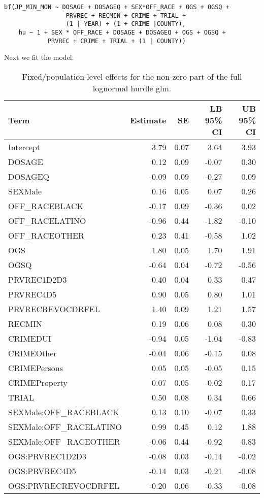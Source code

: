 \documentclass[
  letterpaper,
  DIV=11,
  numbers=noendperiod]{scrartcl}
\begin{document}
\begin{verbatim}
bf(JP_MIN_MON ~ DOSAGE + DOSAGEQ + SEX*OFF_RACE + OGS + OGSQ +
                 PRVREC + RECMIN + CRIME + TRIAL +
                 (1 | YEAR) + (1 + CRIME |COUNTY),
    hu ~ 1 + SEX * OFF_RACE + DOSAGE + DOSAGEQ + OGS + OGSQ +
            PRVREC + CRIME + TRIAL + (1 | COUNTY))
\end{verbatim}

Next we fit the model.

\hypertarget{tbl-brms-hurdle-model-summary-2}{}
\begin{table}
\caption{\label{tbl-brms-hurdle-model-summary-2}Fixed/population-level effects for the non-zero part of the full
lognormal hurdle glm. }\tabularnewline

\centering
\begin{tabular}{l|r|r|r|r}
\hline
Term & Estimate & SE & LB 95\% CI & UB 95\% CI\\
\hline
Intercept & 3.79 & 0.07 & 3.64 & 3.93\\
\hline
DOSAGE & 0.12 & 0.09 & -0.07 & 0.30\\
\hline
DOSAGEQ & -0.09 & 0.09 & -0.27 & 0.09\\
\hline
SEXMale & 0.16 & 0.05 & 0.07 & 0.26\\
\hline
OFF\_RACEBLACK & -0.17 & 0.09 & -0.36 & 0.02\\
\hline
OFF\_RACELATINO & -0.96 & 0.44 & -1.82 & -0.10\\
\hline
OFF\_RACEOTHER & 0.23 & 0.41 & -0.58 & 1.02\\
\hline
OGS & 1.80 & 0.05 & 1.70 & 1.91\\
\hline
OGSQ & -0.64 & 0.04 & -0.72 & -0.56\\
\hline
PRVREC1D2D3 & 0.40 & 0.04 & 0.33 & 0.47\\
\hline
PRVREC4D5 & 0.90 & 0.05 & 0.80 & 1.01\\
\hline
PRVRECREVOCDRFEL & 1.40 & 0.09 & 1.21 & 1.57\\
\hline
RECMIN & 0.19 & 0.06 & 0.08 & 0.30\\
\hline
CRIMEDUI & -0.94 & 0.05 & -1.04 & -0.83\\
\hline
CRIMEOther & -0.04 & 0.06 & -0.15 & 0.08\\
\hline
CRIMEPersons & 0.05 & 0.05 & -0.05 & 0.15\\
\hline
CRIMEProperty & 0.07 & 0.05 & -0.02 & 0.17\\
\hline
TRIAL & 0.50 & 0.08 & 0.34 & 0.66\\
\hline
SEXMale:OFF\_RACEBLACK & 0.13 & 0.10 & -0.07 & 0.33\\
\hline
SEXMale:OFF\_RACELATINO & 0.99 & 0.45 & 0.12 & 1.88\\
\hline
SEXMale:OFF\_RACEOTHER & -0.06 & 0.44 & -0.92 & 0.83\\
\hline
OGS:PRVREC1D2D3 & -0.08 & 0.03 & -0.14 & -0.02\\
\hline
OGS:PRVREC4D5 & -0.14 & 0.03 & -0.21 & -0.08\\
\hline
OGS:PRVRECREVOCDRFEL & -0.20 & 0.06 & -0.33 & -0.08\\
\hline
\end{tabular}
\end{table}
\end{document}
